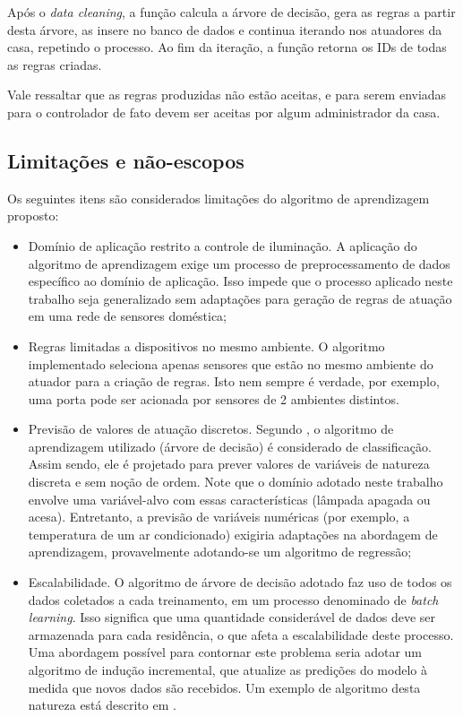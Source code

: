 Após o \textit{data cleaning}, a função calcula a árvore de decisão, gera as regras a partir desta árvore, as insere no banco de dados e continua iterando nos atuadores da casa, repetindo o processo. Ao fim da iteração, a função retorna os IDs de todas as regras criadas.

Vale ressaltar que as regras produzidas não estão aceitas, e para serem enviadas para o controlador de fato devem ser aceitas por algum administrador da casa.

\subsection{Limitações e não-escopos} \label{subsec:limit_aprendizgem}
Os seguintes itens são considerados limitações do algoritmo de aprendizagem proposto:

\begin{itemize}
	\item Domínio de aplicação restrito a controle de iluminação. A aplicação do algoritmo de aprendizagem exige um processo de preprocessamento de dados específico ao domínio de aplicação. Isso impede que o processo aplicado neste trabalho seja generalizado sem adaptações para geração de regras de atuação em uma rede de sensores doméstica;
	\item Regras limitadas a dispositivos no mesmo ambiente. O algoritmo implementado seleciona apenas sensores que estão no mesmo ambiente do atuador para a criação de regras. Isto nem sempre é verdade, por exemplo, uma porta pode ser acionada por sensores de 2 ambientes distintos. 
	\item Previsão de valores de atuação discretos. Segundo \cite{han2005}, o algoritmo de aprendizagem utilizado (árvore de decisão) é considerado de classificação. Assim sendo, ele é projetado para prever valores de variáveis de natureza discreta e sem noção de ordem. Note que o domínio adotado neste trabalho envolve uma variável-alvo com essas características (lâmpada apagada ou acesa). Entretanto, a previsão de variáveis numéricas (por exemplo, a temperatura de um ar condicionado) exigiria adaptações na abordagem de aprendizagem, provavelmente adotando-se um algoritmo de regressão;
	\item Escalabilidade. O algoritmo de árvore de decisão adotado faz uso de todos os dados coletados a cada treinamento, em um processo denominado de \textit{batch learning}. Isso significa que uma quantidade considerável de dados deve ser armazenada para cada residência, o que afeta a escalabilidade deste processo. Uma abordagem possível para contornar este problema seria adotar um algoritmo de indução incremental, que atualize as predições do modelo à medida que novos dados são recebidos. Um exemplo de algoritmo desta natureza está descrito em \cite{utgoff1989}.
\end{itemize}
